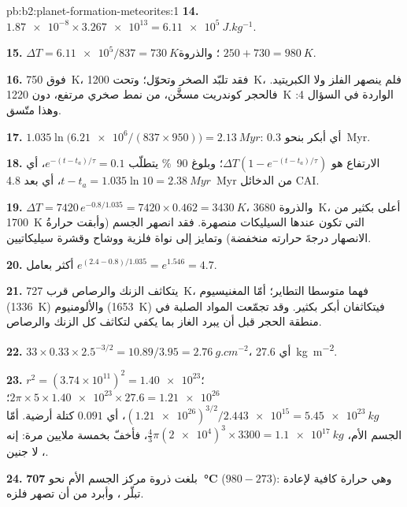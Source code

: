 \begin{solution}{pb:b2:planet-formation-meteorites:1}
\textbf{14.} $\num{1.87e-8}\times\num{3.267e13} = \qty{6.11e5}{J.kg^{-1}}$.

\textbf{15.} $\Delta T = \num{6.11e5}/837 = \qty{730}{K}$؛ والذروة
$250 + 730 = \qty{980}{K}$.

\textbf{16.} فوق \qty{750}{K}، فقد تلبّد الصخر وتحوّل؛ وتحت
\qty{1200}{K}، فلم ينصهر الفلز ولا الكبريتيد. فالحجر كوندريت مسخَّن،
من نمط صخري مرتفع، دون \qty{1220}{K} الواردة في السؤال 4: وهذا متّسق.

\textbf{17.} $1.035\ln\bigl(\num{6.21e6}/(837\times950)\bigr) = \qty{2.13}{Myr}$:
أي أبكر بنحو \qty{0.3}{Myr}.

\textbf{18.} الارتفاع هو $\Delta T(1 - e^{-(t - t_a)/\tau})$؛ وبلوغ \qty{90}{\percent}
يتطلّب $e^{-(t - t_a)/\tau} = 0.1$، أي $t - t_a = 1.035\ln10 = \qty{2.38}{Myr}$، أي
بعد \qty{4.8}{Myr} من الدخائل CAI.

\textbf{19.} $\Delta T = 7420\,e^{-0.8/1.035} = 7420\times0.462 = \qty{3430}{K}$،
والذروة \qty{3680}{K}، أعلى بكثير من \qty{1700}{K} التي تكون عندها السيليكات منصهرة.
فقد انصهر الجسم (وأبقت حرارةُ الانصهار درجةَ حرارته منخفضة)
وتمايز إلى نواة فلزية ووشاح وقشرة سيليكاتيين.

\textbf{20.} أكثر بعامل $e^{(2.4 - 0.8)/1.035} = e^{1.546} = 4.7$.

\textbf{21.} يتكاثف الزنك والرصاص قرب \qty{727}{K}، فهما متوسطا التطاير؛ أمّا المغنيسيوم
(\qty{1336}{K}) والألومنيوم (\qty{1653}{K}) فيتكاثفان أبكر بكثير. وقد تجمّعت المواد الصلبة
في منطقة الحجر قبل أن يبرد الغاز بما يكفي لتكاثف كل الزنك
والرصاص.

\textbf{22.} $33\times0.33\times2.5^{-3/2} = 10.89/3.95 = \qty{2.76}{g.cm^{-2}}$،
أي \qty{27.6}{kg.m^{-2}}.

\textbf{23.} $r^2 = (3.74\times10^{11})^2 = \num{1.40e23}$؛
$2\pi\times5\times\num{1.40e23}\times27.6 = \num{1.21e26}$؛
$(\num{1.21e26})^{3/2}/\num{2.443e15} = \qty{5.45e23}{kg}$، أي $0.091$ كتلة أرضية.
أمّا الجسم الأم، $\tfrac43\pi(\num{2e4})^3\times3300 = \qty{1.1e17}{kg}$، فأخفّ بخمسة
ملايين مرة: إنه ، لا جنين.

\textbf{24.} بلغت ذروة مركز الجسم الأم نحو
\textbf{\qty[text-series-to-math=true]{707}{\degreeCelsius}} ($980 - 273$): وهي حرارة كافية
لإعادة تبلّر ، وأبرد من أن تصهر فلزه.
\end{solution}
